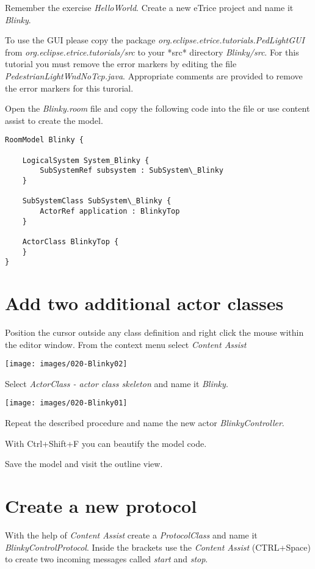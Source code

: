 Remember the exercise \textit{HelloWorld}.
Create a new eTrice project and name it \textit{Blinky}.

To use the GUI please copy the package \textit{org.eclipse.etrice.tutorials.PedLightGUI} from \textit{org.eclipse.etrice.tutorials/src} to your *src* directory \textit{Blinky/src}. For this tutorial you must remove the error markers by editing the file \textit{PedestrianLightWndNoTcp.java}. Appropriate comments are provided to remove the error markers for this turorial.

Open the \textit{Blinky.room} file and copy the following code into the file or use content assist to create the model.

\begin{verbatim} 
RoomModel Blinky {

    LogicalSystem System_Blinky {
        SubSystemRef subsystem : SubSystem\_Blinky
    }

    SubSystemClass SubSystem\_Blinky {
        ActorRef application : BlinkyTop
    }

    ActorClass BlinkyTop {
    }
}
\end{verbatim}

\section{Add two additional actor classes}

Position the cursor outside any class definition and right click the mouse within the editor window. From the context menu select \textit{Content Assist}  

\texttt{[image: images/020-Blinky02]}

Select \textit{ActorClass - actor class skeleton} and name it \textit{Blinky}.

\texttt{[image: images/020-Blinky01]}

Repeat the described procedure and name the new actor \textit{BlinkyController}.

With Ctrl+Shift+F you can beautify the model code. 

Save the model and visit the outline view.

\section{Create a new protocol}

With the help of \textit{Content Assist} create a \textit{ProtocolClass} and name it \textit{BlinkyControlProtocol}.
Inside the brackets use the \textit{Content Assist} (CTRL+Space) to create two incoming messages called \textit{start} and \textit{stop}.


